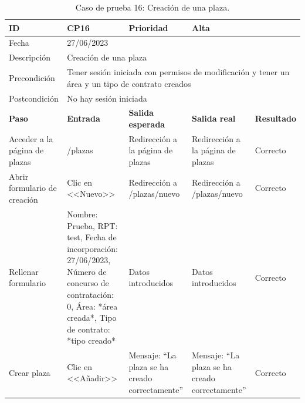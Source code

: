 \begin{table}[H]
\small
\begin{tabular}{p{} p{} p{} p{} p{}}
\cellcolor{gray!25}
ID   & CP16 & \cellcolor{gray!25} Prioridad   & Alta \\ \hline
\cellcolor{gray!25} Fecha	&	\multicolumn{4}{l}{27/06/2023} \\ \hline
\cellcolor{gray!25} Descripción		&	\multicolumn{4}{l}{Creación de una plaza} \\ \hline                                            
\cellcolor{gray!25}
Precondición  & \multicolumn{4}{p{.66\textwidth}}{Tener sesión iniciada con permisos de modificación y tener un área y un tipo de contrato creados} \\ \hline
\cellcolor{gray!25} Postcondición & \multicolumn{4}{l}{No hay sesión iniciada}                                                    \\ \hline
\rowcolor{gray!25}
\textbf{Paso}   & \textbf{Entrada} & \textbf{Salida esperada} & \textbf{Salida real} & \textbf{Resultado} \\ \hline
Acceder a la página de plazas 
& /plazas                                                                          
& Redirección a la página de plazas                                   
& Redirección a la página de plazas                                   
& Correcto                            
\\ \hline
Abrir formulario de creación
& Clic en <<Nuevo>>
& Redirección a /plazas/nuevo
& Redirección a /plazas/nuevo
& Correcto
\\ \hline
Rellenar formulario
& Nombre: Prueba, RPT: test, Fecha de incorporación: 27/06/2023, Número de concurso de contratación: 0, Área: *área creada*, Tipo de contrato: *tipo creado*
& Datos introducidos                     
& Datos introducidos 
& Correcto                            
\\ \hline  
Crear plaza
& Clic en <<Añadir>>
& Mensaje: ``La plaza se ha creado correctamente''                     
& Mensaje: ``La plaza se ha creado correctamente''  
& Correcto                            
\\ \hline              
\end{tabular}
\caption{Caso de prueba 16: Creación de una plaza.}\label{table:CP16}
\end{table}

